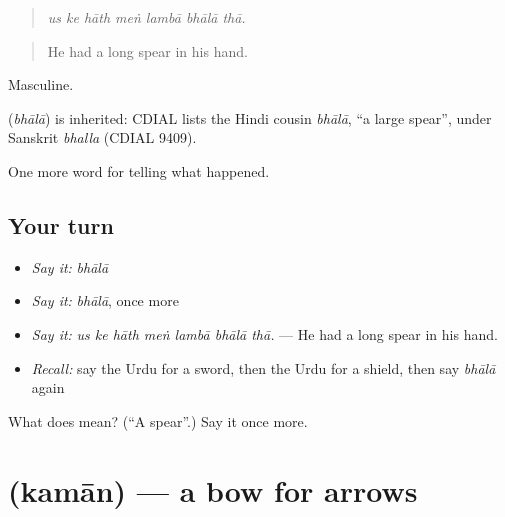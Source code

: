 \begin{quote}
      
\end{quote}

\begin{quote}
\emph{us ke hāth meṅ lambā bhālā thā.}
\end{quote}

\begin{quote}
He had a long spear in his hand.
\end{quote}

Masculine.

\begin{cousinweb}
\textbf{} (\emph{bhālā}) is inherited: CDIAL lists the Hindi cousin \emph{bhālā}, \textquotedblleft{}a large spear\textquotedblright{}, under Sanskrit \emph{bhalla} (CDIAL 9409).
\end{cousinweb}

\begin{grammarlens}[title={What you've built}]
One more word for telling what happened.
\end{grammarlens}

\subsection*{Your turn}
\begin{itemize}
\raggedright
  \item \emph{Say it:} \emph{bhālā}
  \item \emph{Say it:} \emph{bhālā}, once more
  \item \emph{Say it:} \emph{us ke hāth meṅ lambā bhālā thā.} — He had a long spear in his hand.
  \item \emph{Recall:} say the Urdu for a sword, then the Urdu for a shield, then say \emph{bhālā} again
\end{itemize}

\begin{tcolorbox}[breakable,colback=teal!4,colframe=teal!35!black,title={Before you move on}]
What does  mean? (\textquotedblleft{}A spear\textquotedblright{}.) Say it once more.
\end{tcolorbox}
\section[\texorpdfstring{\ur{کمان} (kamān)}{کمان (kamān)}]{ (kamān) — a bow for arrows}

\label{lesson:UR-C310-kaman}



